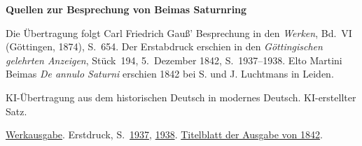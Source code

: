\clearpage\thispagestyle{empty}
\begin{center}\Large\bfseries Quellen zur Besprechung von Beimas Saturnring\end{center}

Die Übertragung folgt Carl Friedrich Gauß’ Besprechung in den \emph{Werken}, Bd.~VI (Göttingen, 1874), S.~654. Der Erstabdruck erschien in den \emph{Göttingischen gelehrten Anzeigen}, Stück~194, 5.~Dezember 1842, S.~1937--1938. Elto Martini Beimas \emph{De annulo Saturni} erschien 1842 bei S. und J. Luchtmans in Leiden.

KI-Übertragung aus dem historischen Deutsch in modernes Deutsch. KI-erstellter Satz.

\href{https://gdz.sub.uni-goettingen.de/id/PPN236007467}{Werkausgabe}. Erstdruck, S.~\href{https://images.p.sub.uni-goettingen.de/iiif/image/gdz:PPN385030444_1842_2:00000899/full/2400,/0/default.jpg}{1937}, \href{https://images.p.sub.uni-goettingen.de/iiif/image/gdz:PPN385030444_1842_2:00000900/full/2400,/0/default.jpg}{1938}. \href{https://archive.org/details/deannulosaturni00beimgoog/page/n7/mode/1up}{Titelblatt der Ausgabe von 1842}.

\clearpage

